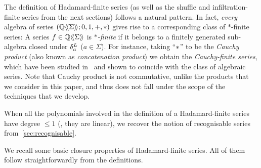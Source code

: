 \begin{remark}
    The definition of Hadamard-finite series (as well as the shuffle and infiltration-finite series from the next sections) follows a natural pattern.
    In fact, \emph{every} algebra of series $(\mathbb Q\langle\!\langle\Sigma\rangle\!\rangle; 0, 1, {+}, {\operatorname{\ast}})$
    gives rise to a corresponding class of $*$-finite series:
    A series $f \in \mathbb Q\langle\!\langle\Sigma\rangle\!\rangle$ is \emph{$*$-finite}
    if it belongs to a finitely generated sub-algebra closed under $\delta^L_{a}$ ($a \in \Sigma$).
    For instance, taking ``$\operatorname{\ast}$'' to be the \emph{Cauchy product} (also known as \emph{concatenation product})
    we obtain the \emph{Cauchy-finite series},
    which have been studied in~\cite{Wechler:MFCS:1979} and shown to coincide with the class of algebraic series.
    Note that Cauchy product is not commutative, unlike the products that we consider in this paper,
    and thus does not fall under the scope of the techniques that we develop.
\end{remark}

\begin{remark}
    When all the polynomials involved in the definition of a Hadamard-finite series have degree $\leq 1$
    (\ie, they are linear), we recover the notion of recognisable series from~\cref{sec:recognisable}.
\end{remark}

We recall some basic closure properties of Hadamard-finite series.
All of them follow straightforwardly from the definitions.

